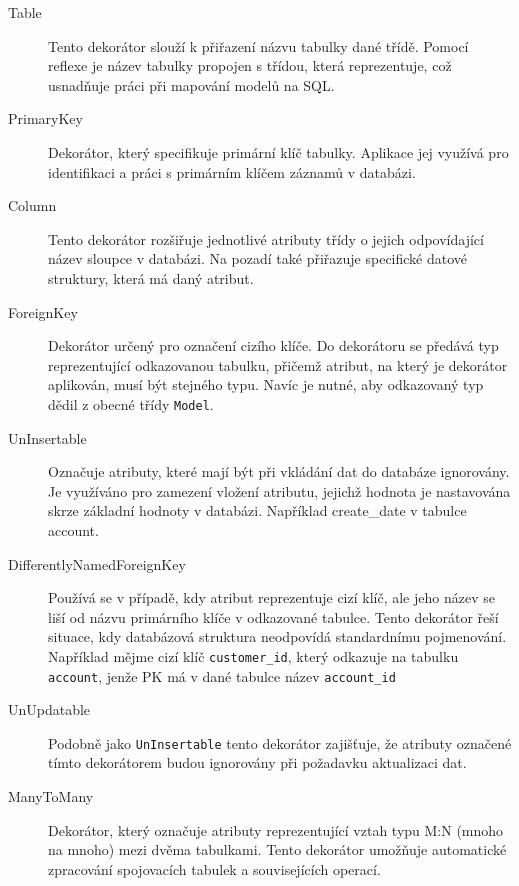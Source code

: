 \begin{description}
    \item[Table] 
    Tento dekorátor slouží k přiřazení názvu tabulky dané třídě. Pomocí reflexe je název tabulky propojen s třídou, která reprezentuje, což usnadňuje práci při mapování modelů na SQL.
    \item[PrimaryKey]  
Dekorátor, který specifikuje primární klíč tabulky. Aplikace jej využívá pro identifikaci a práci s primárním klíčem záznamů v databázi.

\item[Column] 
Tento dekorátor rozšiřuje jednotlivé atributy třídy o jejich odpovídající název sloupce v databázi. Na pozadí také přiřazuje specifické datové struktury, která má daný atribut.

\item[ForeignKey] 
Dekorátor určený pro označení cizího klíče. Do dekorátoru se předává typ reprezentující odkazovanou tabulku, přičemž atribut, na který je dekorátor aplikován, musí být stejného typu. Navíc je nutné, aby odkazovaný typ dědil z obecné třídy \texttt{Model}.

\item[UnInsertable]
Označuje atributy, které mají být při vkládání dat do databáze ignorovány. Je využíváno pro zamezení vložení atributu, jejichž hodnota je nastavována skrze základní hodnoty v databázi. Například create\_date v tabulce account.

\item[DifferentlyNamedForeignKey]  
Používá se v případě, kdy atribut reprezentuje cizí klíč, ale jeho název se liší od názvu primárního klíče v odkazované tabulce. Tento dekorátor řeší situace, kdy databázová struktura neodpovídá standardnímu pojmenování. Například mějme cizí klíč \texttt{customer\_id}, který odkazuje na tabulku \texttt{account}, jenže PK má v dané tabulce název \texttt{account\_id}

\item[UnUpdatable]  
Podobně jako \texttt{UnInsertable} tento dekorátor zajišťuje, že atributy označené tímto dekorátorem budou ignorovány při požadavku aktualizaci dat.

\item[ManyToMany]
Dekorátor, který označuje atributy reprezentující vztah typu M:N (mnoho na mnoho) mezi dvěma tabulkami. Tento dekorátor umožňuje automatické zpracování spojovacích tabulek a souvisejících operací.
\end{description}